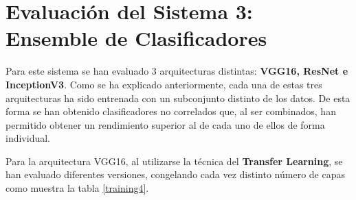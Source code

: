 \documentclass[
  12pt,
  spanish,
  a4paperpaper,
]{report}
\begin{document}
\newpage

\hypertarget{evaluaciuxf3n-del-sistema-3-ensemble-de-clasificadores}{%
\section{Evaluación del Sistema 3: Ensemble de
Clasificadores}\label{evaluaciuxf3n-del-sistema-3-ensemble-de-clasificadores}}

Para este sistema se han evaluado 3 arquitecturas distintas:
\textbf{VGG16, ResNet e InceptionV3}. Como se ha explicado
anteriormente, cada una de estas tres arquitecturas ha sido entrenada
con un subconjunto distinto de los datos. De esta forma se han obtenido
clasificadores no correlados que, al ser combinados, han permitido
obtener un rendimiento superior al de cada uno de ellos de forma
individual.

Para la arquitectura VGG16, al utilizarse la técnica del
\textbf{Transfer Learning}, se han evaluado diferentes versiones,
congelando cada vez distinto número de capas como muestra la tabla
\ref{training4}.
\end{document}
